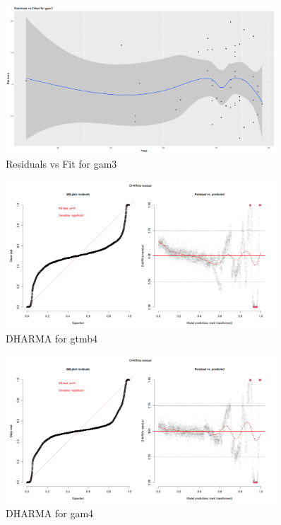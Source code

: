 \begin{figure}[h]
    \centering
    \includegraphics[width=0.9\textwidth]{visuals/resvsfit_gam3.png}
    \caption{Residuals vs Fit for gam3}
    \label{fig:resvsfitgam3}
\end{figure}

\begin{figure}[h]
    \centering
    \includegraphics[width=0.9\textwidth]{visuals/DHARMA_gtmb4.png}
    \caption{DHARMA for gtmb4}
    \label{fig:dharmagtmb4}
\end{figure}

\begin{figure}[h]
    \centering
    \includegraphics[width=0.9\textwidth]{visuals/DHARMa_gam4.png}
    \caption{DHARMA for gam4}
    \label{fig:dharmagam4}
\end{figure}

